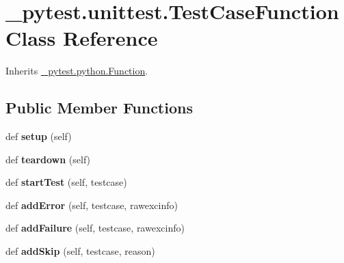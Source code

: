 \hypertarget{class__pytest_1_1unittest_1_1_test_case_function}{}\section{\+\_\+pytest.\+unittest.\+Test\+Case\+Function Class Reference}
\label{class__pytest_1_1unittest_1_1_test_case_function}


Inherits \hyperlink{class__pytest_1_1python_1_1_function}{\+\_\+pytest.\+python.\+Function}.

\subsection*{Public Member Functions}
\begin{DoxyCompactItemize}
\item 
\mbox{\label{class__pytest_1_1unittest_1_1_test_case_function_aad248ee5547f4e25e79389bdeb14e176}} 
def {\bfseries setup} (self)
\item 
\mbox{\label{class__pytest_1_1unittest_1_1_test_case_function_ac3c0bcc1320d9943295b672508e60cf6}} 
def {\bfseries teardown} (self)
\item 
\mbox{\label{class__pytest_1_1unittest_1_1_test_case_function_ab8207fb92e428e801661412451efc92e}} 
def {\bfseries start\+Test} (self, testcase)
\item 
\mbox{\label{class__pytest_1_1unittest_1_1_test_case_function_aa4a35b1bd8f75c5b83f05da8165dad7b}} 
def {\bfseries add\+Error} (self, testcase, rawexcinfo)
\item 
\mbox{\label{class__pytest_1_1unittest_1_1_test_case_function_a9186e5e074faa5eb23a0e5429138bb56}} 
def {\bfseries add\+Failure} (self, testcase, rawexcinfo)
\item 
\mbox{\label{class__pytest_1_1unittest_1_1_test_case_function_ad585a5b45445a31dadd898319ee4d298}} 
def {\bfseries add\+Skip} (self, testcase, reason)

\end{DoxyCompactItemize}
